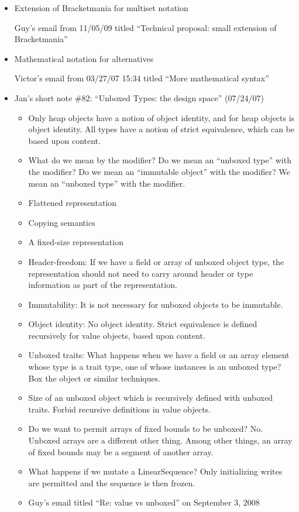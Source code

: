 \begin{itemize}
\item Extension of Bracketmania for multiset notation

Guy's email from 11/05/09 titled ``Technical proposal: small extension of Bracketmania''

\item Mathematical notation for alternatives

Victor's email from 03/27/07 15:34
titled ``More mathematical syntax''

\item Jan's short note \#82: ``Unboxed Types: the design space'' (07/24/07)
 \begin{itemize}
\item Only heap objects have a notion of object identity, and for heap objects
 is object identity. All types have a notion of strict equivalence, which can be based upon content.
\item What do we mean by the  modifier? Do we mean an ``unboxed type'' with the  modifier? Do we mean an ``immutable object'' with the  modifier? We mean an ``unboxed type'' with the  modifier.
\item Flattened representation
\item Copying semantics
\item A fixed-size representation
\item Header-freedom: If we have a field or array of unboxed object type, the representation should not need to carry around header or type information as part of the representation.
\item Immutability: It is not necessary for unboxed objects to be immutable.
\item Object identity: No object identity. Strict equivalence is defined recursively for value objects, based upon content.
\item Unboxed traits: What happens when we have a field or an array element whose type is a trait type, one of whose instances is an unboxed type? Box the object or similar techniques.
\item Size of an unboxed object which is recursively defined with unboxed traits. Forbid recursive definitions in value objects.
\item Do we want to permit arrays of fixed bounds to be unboxed? No. Unboxed arrays are a different other thing. Among other things, an array of fixed bounds may be a segment of another array.
\item What happens if we mutate a LinearSequence? Only initializing writes are permitted and the sequence is then frozen.
\item Guy's email titled ``Re: value vs unboxed'' on September 3, 2008
 \end{itemize}


\end{itemize}
